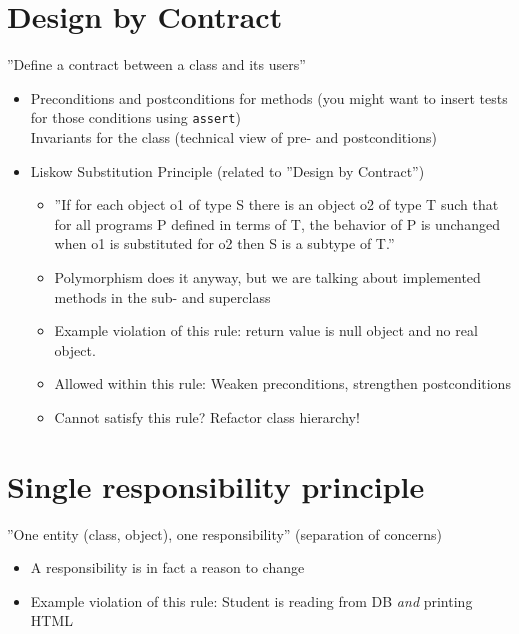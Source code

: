 \documentclass[a4paper]{report}
\begin{document}
\section{Design by Contract}

''Define a contract between a class and its users''

\begin{itemize}
  \item Preconditions and postconditions for methods (you might want to
        insert tests for those conditions using \texttt{assert}) \\
        Invariants for the class (technical view of pre- and postconditions)
  \item Liskow Substitution Principle (related to ''Design by Contract'')
        \begin{itemize}
          \item ''If for each object o1 of type S there is an object o2 of
                  type T such that for all programs P defined in terms of T,
                  the behavior of P is unchanged when o1 is substituted for
                  o2 then S is a subtype of T.''
          \item Polymorphism does it anyway, but we are talking about
                implemented methods in the sub- and superclass
          \item Example violation of this rule:
                return value is null object and no real object.
          \item Allowed within this rule:
                Weaken preconditions, strengthen postconditions
          \item Cannot satisfy this rule? Refactor class hierarchy!
        \end{itemize}
\end{itemize}

\section{Single responsibility principle}

''One entity (class, object), one responsibility'' (separation of concerns)

\begin{itemize}
  \item A responsibility is in fact a reason to change
  \item Example violation of this rule: Student is reading from DB
        \emph{and} printing HTML
\end{itemize}
\end{document}
